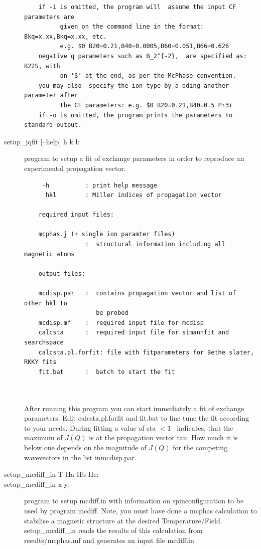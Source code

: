\begin{description}
\begin{verbatim}
    if -i is omitted, the program will  assume the input CF parameters are
          given on the command line in the format: Bkq=x.xx,Bkq=x.xx, etc.
          e.g. $0 B20=0.21,B40=0.0005,B60=0.051,B66=0.626
    negative q parameters such as B_2^{-2},  are specified as:  B22S, with 
          an 'S' at the end, as per the McPhase convention.
    you may also  specify the ion type by a dding another  parameter after
          the CF parameters: e.g. $0 B20=0.21,B40=0.5 Pr3+
    if -o is omitted, the program prints the parameters to standard output.
  \end{verbatim}
\item[\prg   setup\_jqfit\index{setup\_jqfit}{[-h]} {[--help]} h k l:] program to setup a fit of exchange parameters in order to reproduce an experimental propagation vector.
\begin{verbatim}
     -h          : print help message
      hkl        : Miller indices of propagation vector

    required input files:

    mcphas.j (+ single ion paramter files)
                 :  structural information including all magnetic atoms

    output files:

    mcdisp.par   :  contains propagation vector and list of other hkl to
                    be probed
    mcdisp.mf    :  required input file for mcdisp
    calcsta      :  required input file for simannfit and searchspace
    calcsta.pl.forfit: file with fitparameters for Bethe slater, RKKY fits
    fit.bat      :  batch to start the fit

   
\end{verbatim}

 After running this program you can start immediately a fit of exchange
    parameters. Edit {\prg calcsta.pl.forfit} and {\prg fit.bat} to fine tune the fit 
    according to your needs.
    During fitting a value of sta $< 1$~ indicates, that the maximum of $J(Q)$ is
    at the propagation vector tau. How much it is below one depends on the
    magnitude of $J(Q)$ for the competing wavevectors in the list in{\prg  mcdisp.par}.

\item [\prg setup\_mcdiff\_in\index{setup\_mcdiff\_in}  T Ha Hb Hc:] 
\item [\prg setup\_mcdiff\_in\index{setup\_mcdiff\_in}  x y:] 
program
 to setup {\prg mcdiff.in} with information on spinconfiguration
                    to be used by program {\prg mcdiff}. Note, you must
                    have done a {\prg mcphas} calculation to stabilise
                    a magnetic structure at the desired Temperature/Field.
                  { \prg   setup\_mcdiff\_in} reads the results of this calculation
                    from {\prg results/mcphas.mf} and generates an input file
                    {\prg mcdiff.in}


\end{description}
